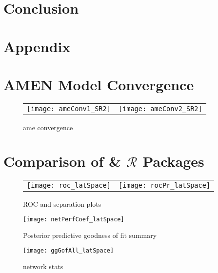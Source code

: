 \section{Conclusion}



\newpage
\section{Appendix}

\section{AMEN Model Convergence}

\begin{figure}[ht]
	\centering
	\begin{tabular}{cc}
	\texttt{[image: ameConv1\_SR2]} &
	\texttt{[image: ameConv2\_SR2]}
	\end{tabular}
	\caption{ame convergence}
	\label{fig:ameConv}
\end{figure}
\FloatBarrier
\newpage

\section{Comparison of  \&  $\mathcal{R}$ Packages}



% 

\begin{figure}[ht]
	\centering
	\begin{tabular}{cc}
	\texttt{[image: roc\_latSpace]} & 
	\texttt{[image: rocPr\_latSpace]}
	\end{tabular}
	\caption{ROC and separation plots}
	\label{fig:roc_latentSpace}
\end{figure}

\begin{figure}[ht]
	\centering
	\texttt{[image: netPerfCoef\_latSpace]}
	\caption{Posterior predictive goodness of fit summary}
	\label{fig:netPerfCoef_latSpace}
\end{figure}

\begin{figure}[ht]
	\centering
	\texttt{[image: ggGofAll\_latSpace]}
	\caption{network stats }
	\label{fig:gofAll_latSpace}
\end{figure}
\FloatBarrier
\newpage

